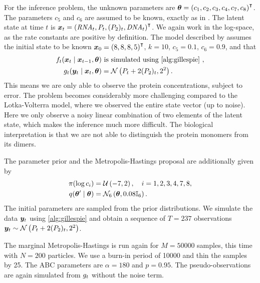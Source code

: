 For the inference problem, the unknown parameters are $\bm{\theta} = \left(c_1, c_2, c_3, c_4, c_7, c_8\right)^\intercal$. The parameters $c_5$ and $c_6$ are assumed to be known, exactly as in \cite{wilkinson}. The latent state at time $t$ is $\bm{x}_t = \left(\mathit{RNA}_t, P_t, (P_2)_t, \mathit{DNA}_t\right)^\intercal$. We again work in the log-space, as the rate constants are positive by definition. The model described by \cite{wilkinson} assumes the initial state to be known $\bm{x}_0 = \left(8,8,8,5\right)^\intercal$, ${k = 10}$, ${c_5 = 0.1}$, ${c_6 = 0.9}$, and that
\begin{equation*}
\begin{split}
\trans_t(\bx_t \mid \bx_{t-1}, \btheta) & \text{ is simulated using \autoref{alg:gillespie} }, \\
\obs_t(\by_t \mid \bx_{t}, \btheta) &= \mathcal{N}\left(P_t + 2 (P_2)_t, 2^2\right).
\end{split}
\end{equation*}
This means we are only able to observe the protein concentrations, subject to error. The problem becomes considerably more challenging compared to the Lotka-Volterra model, where we observed the entire state vector (up to noise). Here we only observe a noisy linear combination of two elements of the latent state, which makes the inference much more difficult. The biological interpretation is that we are not able to distinguish the protein monomers from its dimers.

The parameter prior and the Metropolis-Hastings proposal are additionally given by
\begin{equation*}
\begin{split}
\pi(\log c_i) &= \mathcal{U}\left(-7, 2\right), \quad i = 1, 2, 3, 4, 7, 8, \\
q(\bm{\theta}^\prime \mid \bm{\theta}) &= \mathcal{N}_6\left(\bm{\theta}, 0.08 \mathbb{I}_6\right).
\end{split}
\end{equation*}
The initial parameters are sampled from the prior distributions. We simulate the data $\bm{y}_t$ using \autoref{alg:gillespie} and obtain a sequence of $T = 237$ observations $\bm{y}_t \sim \mathcal{N}\left(P_t + 2 (P_2)_t, 2^2\right)$.

The marginal Metropolis-Hastings is run again for $M = 50000$ samples, this time with $N = 200$ particles. We use a burn-in period of 10000 and thin the samples by 25. The ABC parameters are $\alpha = 180$ and $p = 0.95$. The pseudo-observations are again simulated from $g_t$ without the noise term.

